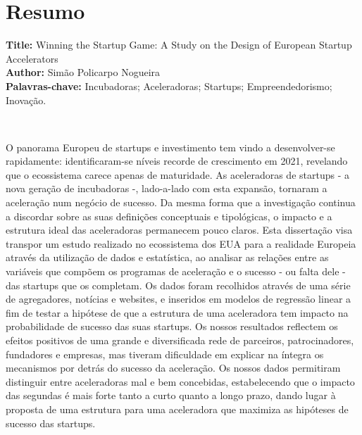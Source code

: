 \documentclass[
  12pt,
]{article}
\begin{document}
\clearpage

\hypertarget{resumo}{%
\section*{Resumo}\label{resumo}}

\textbf{Title:} Winning the Startup Game: A Study on the Design of European Startup Accelerators\\
\textbf{Author:} Simão Policarpo Nogueira\\
\textbf{Palavras-chave:} Incubadoras; Aceleradoras; Startups; Empreendedorismo; Inovação.

~

O panorama Europeu de startups e investimento tem vindo a desenvolver-se rapidamente: identificaram-se níveis recorde de crescimento em 2021, revelando que o ecossistema carece apenas de maturidade. As aceleradoras de startups - a nova geração de incubadoras -, lado-a-lado com esta expansão, tornaram a aceleração num negócio de sucesso. Da mesma forma que a investigação continua a discordar sobre as suas definições conceptuais e tipológicas, o impacto e a estrutura ideal das aceleradoras permanecem pouco claros. Esta dissertação visa transpor um estudo realizado no ecossistema dos EUA para a realidade Europeia através da utilização de dados e estatística, ao analisar as relações entre as variáveis que compõem os programas de aceleração e o sucesso - ou falta dele - das startups que os completam. Os dados foram recolhidos através de uma série de agregadores, notícias e websites, e inseridos em modelos de regressão linear a fim de testar a hipótese de que a estrutura de uma aceleradora tem impacto na probabilidade de sucesso das suas startups. Os nossos resultados reflectem os efeitos positivos de uma grande e diversificada rede de parceiros, patrocinadores, fundadores e empresas, mas tiveram dificuldade em explicar na íntegra os mecanismos por detrás do sucesso da aceleração. Os nossos dados permitiram distinguir entre aceleradoras mal e bem concebidas, estabelecendo que o impacto das segundas é mais forte tanto a curto quanto a longo prazo, dando lugar à proposta de uma estrutura para uma aceleradora que maximiza as hipóteses de sucesso das startups.

\clearpage{\hypersetup{linkcolor=black}\tableofcontents}
\clearpage{\hypersetup{linkcolor=black}\listoffigures\listoftables}
\clearpage{}\setcounter{page}{1}

\clearpage
\end{document}
